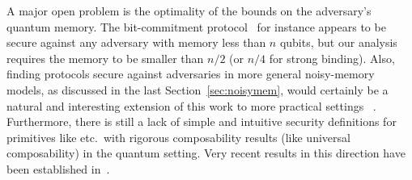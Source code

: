 A major open problem is the optimality of the bounds on the
adversary's quantum memory. The bit-commitment protocol \comm\ for
instance appears to be secure against any adversary with memory less
than $n$ qubits, but our analysis requires the memory to be smaller
than $n/2$ (or $n/4$ for strong binding).  Also, finding protocols
secure against adversaries in more general 
noisy-memory models, as discussed in the last
Section~\ref{sec:noisymem}, would certainly be a natural and
interesting extension of this work to more practical settings~
\cite{DSTW07privcom}. Furthermore, there is still a lack of simple and
intuitive security definitions for primitives like \OT etc.\ with
rigorous composability results (like universal composability) in the
quantum setting. Very recent results in this direction have been
established in~\cite{WW07privcom}.


